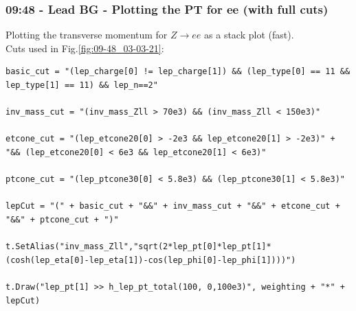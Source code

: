\subsubsection*{09:48 - Lead BG - Plotting the PT for ee (with full cuts)}
Plotting the transverse momentum for $Z \rightarrow ee$ as a stack plot (fast).
\\
Cuts used in Fig.\ref{fig:09-48_03-03-21}:
\begin{lstlisting}
basic_cut = "(lep_charge[0] != lep_charge[1]) && (lep_type[0] == 11 && lep_type[1] == 11) && lep_n==2"

inv_mass_cut = "(inv_mass_Zll > 70e3) && (inv_mass_Zll < 150e3)"

etcone_cut = "(lep_etcone20[0] > -2e3 && lep_etcone20[1] > -2e3)" + "&& (lep_etcone20[0] < 6e3 && lep_etcone20[1] < 6e3)"

ptcone_cut = "(lep_ptcone30[0] < 5.8e3) && (lep_ptcone30[1] < 5.8e3)"

lepCut = "(" + basic_cut + "&&" + inv_mass_cut + "&&" + etcone_cut + "&&" + ptcone_cut + ")"

t.SetAlias("inv_mass_Zll","sqrt(2*lep_pt[0]*lep_pt[1]*(cosh(lep_eta[0]-lep_eta[1])-cos(lep_phi[0]-lep_phi[1])))")

t.Draw("lep_pt[1] >> h_lep_pt_total(100, 0,100e3)", weighting + "*" + lepCut)
\end{lstlisting}

